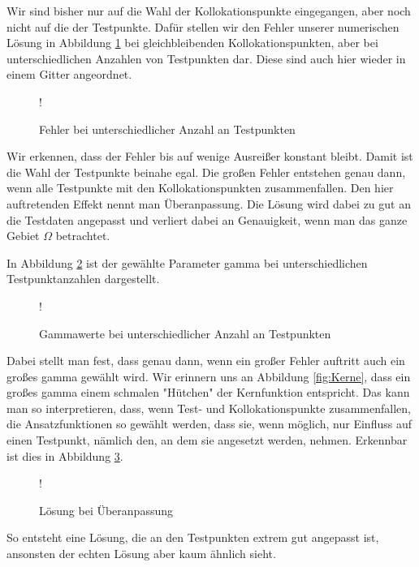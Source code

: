Wir sind bisher nur auf die Wahl der Kollokationspunkte eingegangen, aber noch nicht auf die der Testpunkte. Dafür stellen wir den Fehler unserer numerischen Lösung in Abbildung \ref{fig:testpunkte} bei gleichbleibenden Kollokationspunkten, aber bei unterschiedlichen Anzahlen von Testpunkten dar. Diese sind auch hier wieder in einem Gitter angeordnet.
\begin{figure}[H]
\centering
\resizebox {\columnwidth} {!} {

}
\caption{Fehler bei unterschiedlicher Anzahl an Testpunkten}
\label{fig:testpunkte}
\end{figure}
Wir erkennen, dass der Fehler bis auf wenige Ausreißer konstant bleibt. Damit ist die Wahl der Testpunkte beinahe egal. Die großen Fehler entstehen genau dann, wenn alle Testpunkte mit den Kollokationspunkten zusammenfallen. Den hier auftretenden Effekt nennt man Überanpassung. Die Lösung wird dabei zu gut an die Testdaten angepasst und verliert dabei an Genauigkeit, wenn man das ganze Gebiet $\Omega$ betrachtet. 

In Abbildung \ref{fig:testpunkte-gamma} ist der gewählte Parameter gamma bei unterschiedlichen Testpunktanzahlen dargestellt.
\begin{figure}[ht]
\centering
\resizebox {\columnwidth} {!} {

}
\caption{Gammawerte bei unterschiedlicher Anzahl an Testpunkten}
\label{fig:testpunkte-gamma}
\end{figure}
Dabei stellt man fest, dass genau dann, wenn ein großer Fehler auftritt auch ein großes gamma gewählt wird. Wir erinnern uns an Abbildung \ref{fig:Kerne}, dass ein großes gamma einem schmalen "Hütchen"  der Kernfunktion entspricht. Das kann man so interpretieren, dass, wenn Test- und Kollokationspunkte zusammenfallen, die Ansatzfunktionen so gewählt werden, dass sie, wenn möglich, nur Einfluss auf einen Testpunkt, nämlich den, an dem sie angesetzt werden, nehmen. Erkennbar ist dies in Abbildung \ref{fig:overfitting}.
\begin{figure}[ht]
\centering
\resizebox {\columnwidth} {!} {

}
\caption{Lösung bei Überanpassung}
\label{fig:overfitting}
\end{figure}

So entsteht eine Lösung, die an den Testpunkten extrem gut angepasst ist, ansonsten der echten Lösung aber kaum ähnlich sieht.
